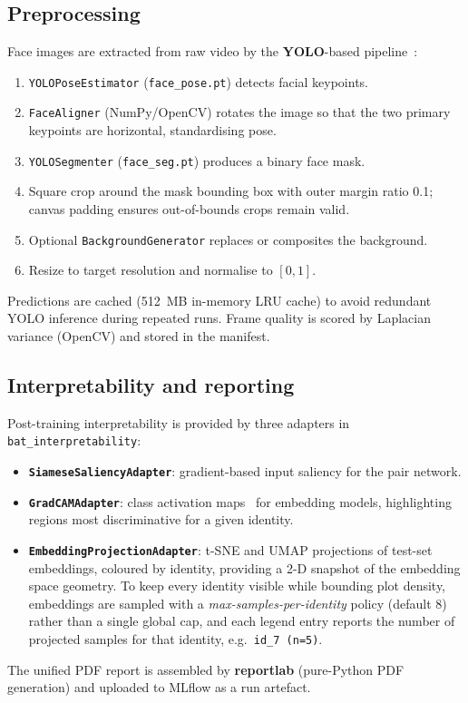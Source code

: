 \subsection{Preprocessing}

Face images are extracted from raw video by the \textbf{YOLO}-based
pipeline~\cite{redmon2016yolo, jocher2022yolov8}:
\begin{enumerate}[leftmargin=1.5em, itemsep=1pt]
  \item \texttt{YOLOPoseEstimator} (\texttt{face\_pose.pt}) detects facial keypoints.
  \item \texttt{FaceAligner} (NumPy/OpenCV) rotates the image so that the two primary
        keypoints are horizontal, standardising pose.
  \item \texttt{YOLOSegmenter} (\texttt{face\_seg.pt}) produces a binary face mask.
  \item Square crop around the mask bounding box with outer margin ratio 0.1; canvas
        padding ensures out-of-bounds crops remain valid.
  \item Optional \texttt{BackgroundGenerator} replaces or composites the background.
  \item Resize to target resolution and normalise to $[0, 1]$.
\end{enumerate}
Predictions are cached (512~MB in-memory LRU cache) to avoid redundant YOLO inference
during repeated runs.  Frame quality is scored by Laplacian variance (OpenCV) and stored
in the manifest.

\subsection{Interpretability and reporting}

Post-training interpretability is provided by three adapters in \texttt{bat\_interpretability}:
\begin{itemize}[itemsep=2pt]
  \item \textbf{\texttt{SiameseSaliencyAdapter}}: gradient-based input saliency for the
        pair network.
  \item \textbf{\texttt{GradCAMAdapter}}: class activation maps~\cite{he2016resnet} for
        embedding models, highlighting regions most discriminative for a given identity.
  \item \textbf{\texttt{EmbeddingProjectionAdapter}}: t-SNE and UMAP projections of
        test-set embeddings, coloured by identity, providing a 2-D snapshot of the
        embedding space geometry.  To keep every identity visible while bounding plot
        density, embeddings are sampled with a \emph{max-samples-per-identity} policy
        (default 8) rather than a single global cap, and each legend entry reports the
        number of projected samples for that identity, e.g.\ \texttt{id\_7 (n=5)}.
\end{itemize}
The unified PDF report is assembled by \textbf{reportlab} (pure-Python PDF generation)
and uploaded to MLflow as a run artefact.

